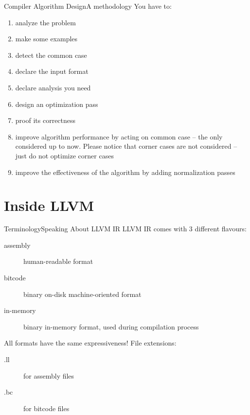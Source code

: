 \documentclass[10pt,mathserif]{beamer}
\begin{document}
\begin{frame}{Compiler Algorithm Design}{A methodology}
	You have to:
	
	\begin{enumerate}
		\item analyze the problem
		\item make some examples
		\item detect the common case
		\item declare the \alert{input format}
		\item declare \alert{analysis} you need
		\item design an \alert{optimization} pass
		\item proof its \alert{correctness}
		\item improve algorithm performance by acting on common case -- the only
		considered up to now. Please notice that corner cases are not considered
		-- just do not optimize corner cases
		\item improve the effectiveness of the algorithm by adding 
		\alert{normalization passes}
	\end{enumerate}
\end{frame}


\section{Inside LLVM}
\begin{frame}{Terminology}{Speaking About LLVM IR}
	LLVM IR comes with 3 different flavours:
	
	\begin{description}
		\item[assembly] human-readable format
		\item[bitcode] binary on-disk machine-oriented format
		\item[in-memory] binary in-memory format, used during compilation process
	\end{description}
	All formats have the same expressiveness!
	\vfill
	File extensions:
	\begin{description}
		\item[.ll] for assembly files
		\item[.bc] for bitcode files
	\end{description}
\end{frame}
\end{document}
